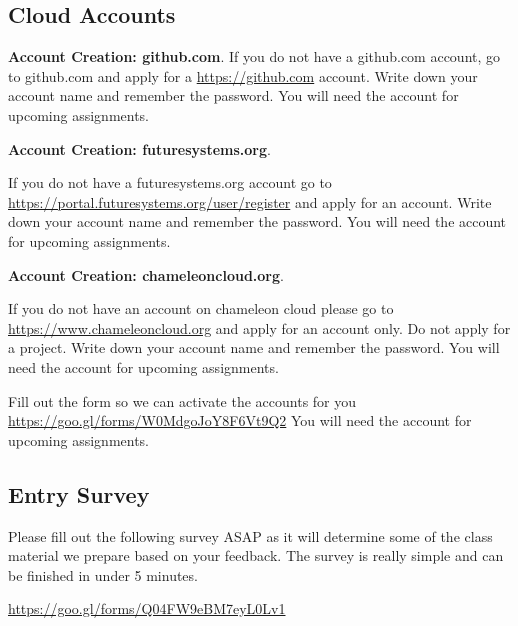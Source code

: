 \subsection{Cloud Accounts}

\begin{exercise}

  {\bf Account Creation: github.com}. If you do not have a github.com
  account, go to github.com and apply for a \url{https://github.com}
  account. Write down your account name and remember the password. You
  will need the account for upcoming assignments.

\end{exercise}

\begin{exercise}

  {\bf Account Creation: futuresystems.org}. 
  
  If you do not have a
  futuresystems.org account go to
  \url{https://portal.futuresystems.org/user/register} and apply for an
  account. Write down your account name and remember the password. You
  will need the account for upcoming assignments.

\end{exercise}

\begin{exercise}
  {\bf Account Creation: chameleoncloud.org}. 
  
  If you do not have an account on chameleon cloud please go to 
  \url{https://www.chameleoncloud.org} and apply for an
  account only. Do not apply for a project. Write down your account
  name and remember the password. You will need the account for
  upcoming assignments.
\end{exercise}

\begin{exercise}
Fill out the form so we can activate the accounts for you
\url{https://goo.gl/forms/W0MdgoJoY8F6Vt9Q2}
You will need the account for
  upcoming assignments.
\end{exercise}

\subsection{Entry Survey}
\begin{exercise}
Please fill out the following survey ASAP as it will determine some of the class material we prepare based on your feedback. The survey is really simple and can be finished in under 5 minutes.

\url{https://goo.gl/forms/Q04FW9eBM7eyL0Lv1}
\end{exercise}

